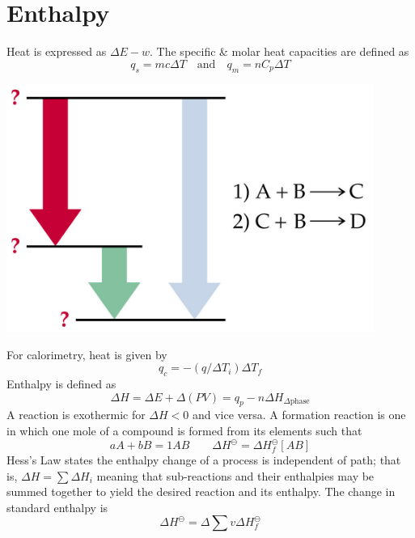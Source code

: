\documentclass{tufte-book}
\begin{document}
\section{Enthalpy}

Heat is expressed as $\Delta E - w$. The specific \& molar heat capacities are defined as \begin{equation}
  q_s = mc \Delta T \quad\text{and}\quad q_m = nC_p \Delta T
\end{equation}
%
\begin{marginfigure}[-10mm]
\begin{center}
  \includegraphics[width=0.9\textwidth]{hess}
\end{center}
\end{marginfigure}
%
For calorimetry, heat is given by \begin{equation}
  q_c = -(q / \Delta T_i) \Delta T_f
\end{equation}
Enthalpy is defined as \begin{equation}
  \Delta H = \Delta E + \Delta (PV) = q_p - n \Delta H_{\Delta \text{phase}}
\end{equation}
A reaction is exothermic for $\Delta H<0$ and vice versa. A formation reaction is one in which one mole of a compound is formed from its elements such that
\begin{equation}
  aA + bB = 1AB \qquad \Delta H^\ominus = \Delta H_f^\ominus [AB]
\end{equation}
Hess's Law states the enthalpy change of a process is independent of path; that is, $\Delta H = \sum \Delta H_i$ meaning that sub-reactions and their enthalpies may be summed together to yield the desired reaction and its enthalpy. The change in standard enthalpy is \begin{equation}
  \Delta H^\ominus = \Delta \sum v \Delta H_f^\ominus
\end{equation}
\end{document}
